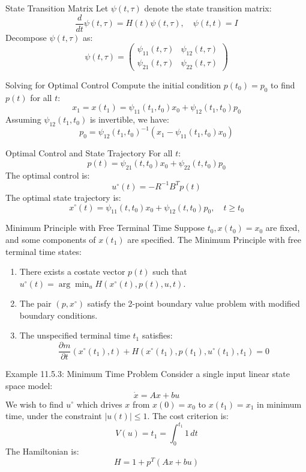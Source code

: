 \documentclass[10pt]{beamer}
\begin{document}
\begin{frame}[fragile]{State Transition Matrix}
  Let \( \psi(t, \tau) \) denote the state transition matrix:
  \[
  \frac{d}{dt} \psi(t, \tau) = H(t) \psi(t, \tau), \quad \psi(t, t) = I
  \]
  Decompose \( \psi(t, \tau) \) as:
  \[
  \psi(t, \tau) = \begin{pmatrix}
  \psi_{11}(t, \tau) & \psi_{12}(t, \tau) \\
  \psi_{21}(t, \tau) & \psi_{22}(t, \tau)
  \end{pmatrix}
  \]
\end{frame}
  
\begin{frame}[fragile]{Solving for Optimal Control}
  Compute the initial condition \( p(t_0) = p_0 \) to find \( p(t) \) for all \( t \):
  \[
  x_1 = x(t_1) = \psi_{11}(t_1, t_0) x_0 + \psi_{12}(t_1, t_0) p_0
  \]
  Assuming \( \psi_{12}(t_1, t_0) \) is invertible, we have:
  \[
  p_0 = \psi_{12}(t_1, t_0)^{-1} (x_1 - \psi_{11}(t_1, t_0) x_0)
  \]
\end{frame}
  
\begin{frame}[fragile]{Optimal Control and State Trajectory}
  For all \( t \):
  \[
  p(t) = \psi_{21}(t, t_0) x_0 + \psi_{22}(t, t_0) p_0
  \]
  The optimal control is:
  \[
  u^\circ(t) = -R^{-1} B^T p(t)
  \]
  The optimal state trajectory is:
  \[
  x^\circ(t) = \psi_{11}(t, t_0) x_0 + \psi_{12}(t, t_0) p_0, \quad t \ge t_0
  \]
\end{frame}
  
\begin{frame}[fragile]{Minimum Principle with Free Terminal Time}
  Suppose \( t_0, x(t_0) = x_0 \) are fixed, and some components of \( x(t_1) \) are specified. The Minimum Principle with free terminal time states:
  \begin{enumerate}
      \item There exists a costate vector \( p(t) \) such that \( u^\circ(t) = \arg \min_u H(x^\circ(t), p(t), u, t) \).
      \item The pair \( (p, x^\circ) \) satisfy the 2-point boundary value problem with modified boundary conditions.
      \item The unspecified terminal time \( t_1 \) satisfies:
      \[
      \frac{\partial m}{\partial t}(x^\circ(t_1), t) + H(x^\circ(t_1), p(t_1), u^\circ(t_1), t_1) = 0
      \]
  \end{enumerate}
\end{frame}
  
\begin{frame}[fragile]{Example 11.5.3: Minimum Time Problem}
  Consider a single input linear state space model:
  \[
  \dot{x} = Ax + bu
  \]
  We wish to find \( u^\circ \) which drives \( x \) from \( x(0) = x_0 \) to \( x(t_1) = x_1 \) in minimum time, under the constraint \( |u(t)| \le 1 \). The cost criterion is:
  \[
  V(u) = t_1 = \int_0^{t_1} 1 \, dt
  \]
  The Hamiltonian is:
  \[
  H = 1 + p^T(Ax + bu)
  \]
\end{frame}
  
\end{document}
